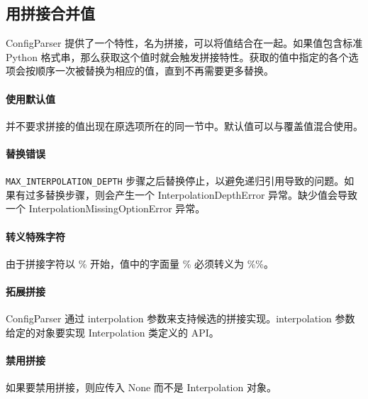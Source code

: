 \subsection{用拼接合并值}
ConfigParser 提供了一个特性，名为拼接，可以将值结合在一起。如果值包含标准 Python 格式串，那么获取这个值时就会触发拼接特性。获取的值中指定的各个选项会按顺序一次被替换为相应的值，直到不再需要更多替换。

\paragraph{使用默认值} 并不要求拼接的值出现在原选项所在的同一节中。默认值可以与覆盖值混合使用。

\paragraph{替换错误} \verb|MAX_INTERPOLATION_DEPTH| 步骤之后替换停止，以避免递归引用导致的问题。如果有过多替换步骤，则会产生一个 InterpolationDepthError 异常。缺少值会导致一个 InterpolationMissingOptionError 异常。
\paragraph{转义特殊字符} 由于拼接字符以 \% 开始，值中的字面量 \% 必须转义为 \%\%。

\paragraph{拓展拼接} ConfigParser 通过 interpolation 参数来支持候选的拼接实现。interpolation 参数给定的对象要实现 Interpolation 类定义的 API。
\paragraph{禁用拼接} 如果要禁用拼接，则应传入 None 而不是 Interpolation 对象。